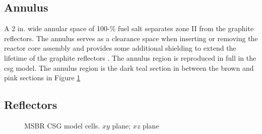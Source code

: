 \subsection{Annulus}
A 2 in. wide annular space of 100-\% fuel salt separates zone II from the
graphite reflectors. The annulus serves as a clearance space when inserting or
removing the reactor core assembly and provides some additional shielding to
extend the lifetime of the graphite reflectors \cite{robertson_conceptual_1971}. The annulus region is reproduced in full in the \Gls{csg} model. The annulus region is the dark teal section in between the brown and pink sections in Figure \ref{fig:msbr-cells}

\subsection{Reflectors}
\begin{figure}[htpb]
    \centering
    \caption[MSBR CSG model cells]{MSBR CSG model cells.
         $xy$ plane; 
         $xz$ plane} 
    \label{fig:msbr-cells}
\end{figure}
